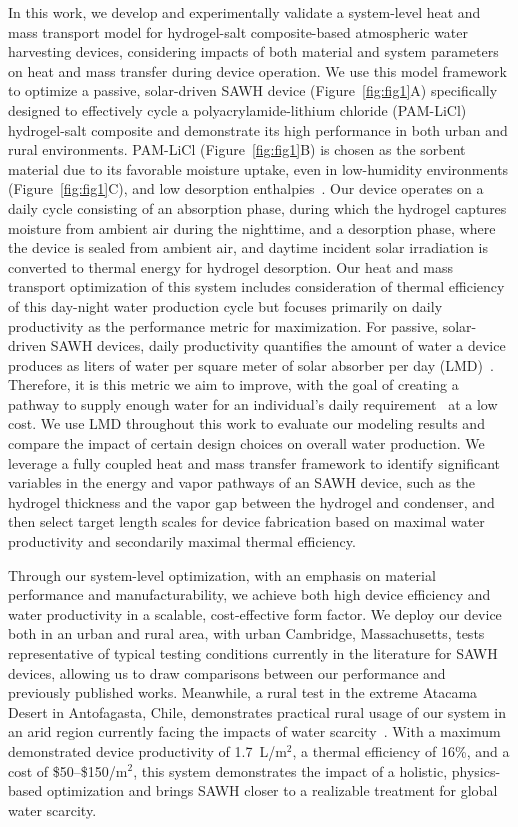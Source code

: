 \documentclass[11pt]{article}
\begin{document}
In this work, we develop and experimentally validate a system-level heat and mass transport model for hydrogel-salt composite-based atmospheric water harvesting devices, considering impacts of both material and system parameters on heat and mass transfer during device operation. We use this model framework to optimize a passive, solar-driven SAWH device (Figure~\ref{fig:fig1}A) specifically designed to effectively cycle a polyacrylamide-lithium chloride (PAM-LiCl) hydrogel-salt composite and demonstrate its high performance in both urban and rural environments. PAM-LiCl (Figure~\ref{fig:fig1}B) is chosen as the sorbent material due to its favorable moisture uptake, even in low-humidity environments (Figure~\ref{fig:fig1}C), and low desorption enthalpies~\cite{lu2022,diazmarin2024b}. Our device operates on a daily cycle consisting of an absorption phase, during which the hydrogel captures moisture from ambient air during the nighttime, and a desorption phase, where the device is sealed from ambient air, and daytime incident solar irradiation is converted to thermal energy for hydrogel desorption. Our heat and mass transport optimization of this system includes consideration of thermal efficiency of this day-night water production cycle but focuses primarily on daily productivity as the performance metric for maximization. For passive, solar-driven SAWH devices, daily productivity quantifies the amount of water a device produces as liters of water per square meter of solar absorber per day (LMD)~\cite{lapotin2021}. Therefore, it is this metric we aim to improve, with the goal of creating a pathway to supply enough water for an individual's daily requirement~\cite{sawka2005} at a low cost. We use LMD throughout this work to evaluate our modeling results and compare the impact of certain design choices on overall water production. We leverage a fully coupled heat and mass transfer framework to identify significant variables in the energy and vapor pathways of an SAWH device, such as the hydrogel thickness and the vapor gap between the hydrogel and condenser, and then select target length scales for device fabrication based on maximal water productivity and secondarily maximal thermal efficiency.

Through our system-level optimization, with an emphasis on material performance and manufacturability, we achieve both high device efficiency and water productivity in a scalable, cost-effective form factor. We deploy our device both in an urban and rural area, with urban Cambridge, Massachusetts, tests representative of typical testing conditions currently in the literature for SAWH devices, allowing us to draw comparisons between our performance and previously published works. Meanwhile, a rural test in the extreme Atacama Desert in Antofagasta, Chile, demonstrates practical rural usage of our system in an arid region currently facing the impacts of water scarcity~\cite{fuentes2021,aitken2016}. With a maximum demonstrated device productivity of 1.7~L/m$^2$, a thermal efficiency of 16\%, and a cost of \$50--\$150/m$^2$, this system demonstrates the impact of a holistic, physics-based optimization and brings SAWH closer to a realizable treatment for global water scarcity.
\end{document}
